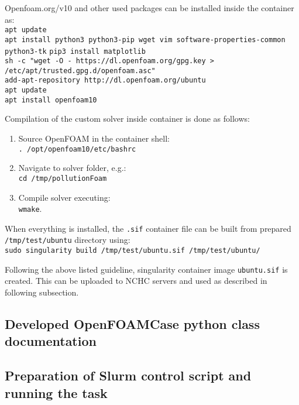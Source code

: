 Openfoam.org/v10 and other used packages can be installed inside the container as:\\[0.2cm]
    \indent\quad\quad\texttt{apt update}\\[0.2cm]
    \indent\quad\quad\texttt{apt install python3 python3-pip wget vim software-properties-common \\ \indent\quad\quad\quad\quad python3-tk}
    \indent\quad\quad\texttt{pip3 install matplotlib}\\[0.2cm]
    \indent\quad\quad\texttt{sh -c "wget -O - https://dl.openfoam.org/gpg.key >} \\ \indent\quad\quad\quad\quad\texttt{/etc/apt/trusted.gpg.d/openfoam.asc"}\\[0.2cm]
    \indent\quad\quad\texttt{add-apt-repository http://dl.openfoam.org/ubuntu}\\[0.2cm]
    \indent\quad\quad\texttt{apt update}\\[0.2cm]
    \indent\quad\quad\texttt{apt install openfoam10}

Compilation of the custom solver inside container is done as follows:
\begin{enumerate}
    \item Source OpenFOAM in the container shell:\\[0.2cm] 
    \indent\quad\quad\texttt{. /opt/openfoam10/etc/bashrc}
    \item Navigate to solver folder, e.g.:\\[0.2cm] 
    \indent\quad\quad\texttt{cd /tmp/pollutionFoam} 
    \item Compile solver executing: \\[0.2cm] 
    \indent\quad\quad\texttt{wmake}.
\end{enumerate}

When everything is installed, the \texttt{.sif} container file can be built from prepared \texttt{/tmp/test/ubuntu} directory using:\\[0.2cm] 
\indent\quad\quad\texttt{sudo singularity build /tmp/test/ubuntu.sif /tmp/test/ubuntu/}


Following the above listed guideline, singularity container image \texttt{ubuntu.sif} is created. This can be uploaded to NCHC servers and used as described in following subsection. 

\subsection{Developed OpenFOAMCase python class documentation}
\label{subsec:ofCaseClass}

\subsection{Preparation of Slurm control script and running the task}
\label{subsec:slurmCtrl}

